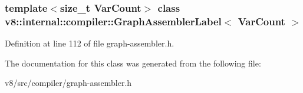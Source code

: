 \subsubsection*{template$<$size\+\_\+t Var\+Count$>$\newline
class v8\+::internal\+::compiler\+::\+Graph\+Assembler\+Label$<$ Var\+Count $>$}



Definition at line 112 of file graph-\/assembler.\+h.



The documentation for this class was generated from the following file\+:\begin{DoxyCompactItemize}
\item 
v8/src/compiler/graph-\/assembler.\+h\end{DoxyCompactItemize}
